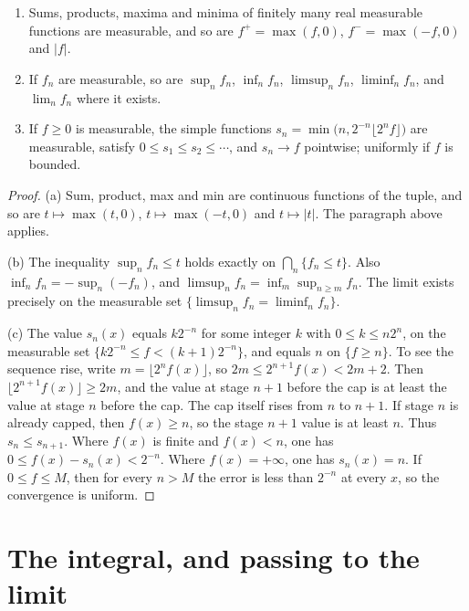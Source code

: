 \begin{proposition}\label{prop:measurablefns}
\begin{enumerate}[label=(\alph*)]
\item Sums, products, maxima and minima of finitely many real measurable functions are measurable, and so are \(f^+=\max(f,0)\), \(f^-=\max(-f,0)\) and \(|f|\).
\item If \(f_n\) are measurable, so are \(\sup_nf_n\), \(\inf_nf_n\), \(\limsup_nf_n\), \(\liminf_nf_n\), and \(\lim_nf_n\) where it exists.
\item If \(f\ge0\) is measurable, the simple functions \(s_n=\min\bigl(n,2^{-n}\lfloor2^nf\rfloor\bigr)\) are measurable, satisfy \(0\le s_1\le s_2\le\cdots\), and \(s_n\to f\) pointwise; uniformly if \(f\)
is bounded.
\end{enumerate}
\end{proposition}
\begin{proof}
(a) Sum, product, max and min are continuous functions of the tuple, and so are \(t\mapsto\max(t,0)\), \(t\mapsto\max(-t,0)\) and \(t\mapsto|t|\). The paragraph above applies.

(b) The inequality \(\sup_nf_n\le t\) holds exactly on \(\bigcap_n\{f_n\le t\}\). Also \(\inf_nf_n=-\sup_n(-f_n)\), and \(\limsup_nf_n=\inf_m\sup_{n\ge m}f_n\). The limit exists precisely on the measurable set \(\{\limsup_nf_n=\liminf_nf_n\}\).

(c) The value \(s_n(x)\) equals \(k2^{-n}\) for some integer \(k\) with \(0\le k\le n2^n\), on the measurable set \(\{k2^{-n}\le f<(k+1)2^{-n}\}\), and equals \(n\) on \(\{f\ge n\}\). To see the sequence rise, write \(m=\lfloor2^nf(x)\rfloor\), so \(2m\le2^{n+1}f(x)<2m+2\). Then \(\lfloor2^{n+1}f(x)\rfloor\ge2m\), and the value at stage \(n+1\) before the cap is at least the value at stage \(n\) before the cap. The cap itself rises from \(n\) to \(n+1\). If stage \(n\) is already capped, then \(f(x)\ge n\), so the stage \(n+1\) value is at least \(n\). Thus \(s_n\le s_{n+1}\). Where \(f(x)\) is finite and \(f(x)<n\), one has \(0\le f(x)-s_n(x)<2^{-n}\). Where \(f(x)=+\infty\), one has \(s_n(x)=n\). If \(0\le f\le M\), then for every \(n>M\) the error is less than \(2^{-n}\) at every \(x\), so the convergence is uniform.
\end{proof}

\section{The integral, and passing to the limit}

